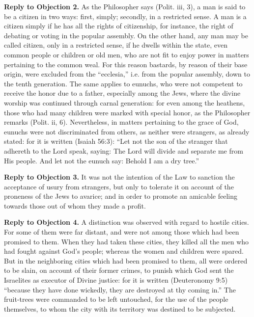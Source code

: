 \textbf{Reply to Objection 2.} As the Philosopher says (Polit. iii, 3), a man is said to be a citizen in two ways: first, simply; secondly, in a restricted sense. A man is a citizen simply if he has all the rights of citizenship, for instance, the right of debating or voting in the popular assembly. On the other hand, any man may be called citizen, only in a restricted sense, if he dwells within the state, even common people or children or old men, who are not fit to enjoy power in matters pertaining to the common weal. For this reason bastards, by reason of their base origin, were excluded from the ``ecclesia,'' i.e. from the popular assembly, down to the tenth generation. The same applies to eunuchs, who were not competent to receive the honor due to a father, especially among the Jews, where the divine worship was continued through carnal generation: for even among the heathens, those who had many children were marked with special honor, as the Philosopher remarks (Polit. ii, 6). Nevertheless, in matters pertaining to the grace of God, eunuchs were not discriminated from others, as neither were strangers, as already stated: for it is written (Isaiah 56:3): ``Let not the son of the stranger that adhereth to the Lord speak, saying: The Lord will divide and separate me from His people. And let not the eunuch say: Behold I am a dry tree.''

\textbf{Reply to Objection 3.} It was not the intention of the Law to sanction the acceptance of usury from strangers, but only to tolerate it on account of the proneness of the Jews to avarice; and in order to promote an amicable feeling towards those out of whom they made a profit.

\textbf{Reply to Objection 4.} A distinction was observed with regard to hostile cities. For some of them were far distant, and were not among those which had been promised to them. When they had taken these cities, they killed all the men who had fought against God's people; whereas the women and children were spared. But in the neighboring cities which had been promised to them, all were ordered to be slain, on account of their former crimes, to punish which God sent the Israelites as executor of Divine justice: for it is written (Deuteronomy 9:5) ``because they have done wickedly, they are destroyed at thy coming in.'' The fruit-trees were commanded to be left untouched, for the use of the people themselves, to whom the city with its territory was destined to be subjected.

